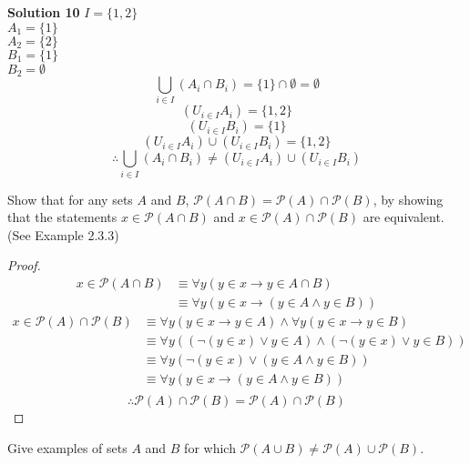 \textbf{Solution 10}
$I = \{1, 2\}$ \\
$A_1 = \{1\}$ \\
$A_2 = \{2\}$ \\
$B_1 = \{1\}$ \\
$B_2 = \emptyset$ \\
\[\bigcup_{i \in I}(A_i \cap B_i) = \{1\} \cap \emptyset = \emptyset\]
\[\left(U_{i \in I}A_i\right) = \{1, 2\}\]
\[\left(U_{i \in I}B_i\right) = \{1\}\]
\[\left(U_{i \in I}A_i\right) \cup \left(U_{i \in I}B_i\right) = \{1, 2\}\]
\[\therefore \bigcup_{i \in I}(A_i \cap B_i) \not = \left(U_{i \in I}A_i\right) \cup \left(U_{i \in I}B_i\right)\]

\begin{tcolorbox}[title=Problem 11, breakable]
    Show that for any sets $A$ and $B$, $\mathcal{P}(A \cap B) = \mathcal{P}(A) \cap \mathcal{P}(B)$,
    by showing that the statements $x \in \mathcal{P}(A \cap B)$ and 
    $x \in \mathcal{P}(A) \cap \mathcal{P}(B)$ are equivalent. (See Example 2.3.3)
\end{tcolorbox}

\begin{proof}
    \begin{align*}
        x \in \mathcal{P}(A \cap B)
            &\equiv \forall{y}(y \in x \rightarrow y \in A \cap B) && \\
            &\equiv \forall{y}(y \in x \rightarrow (y \in A \wedge y \in B)) 
    \end{align*}
    \begin{align*}
        x \in \mathcal{P}(A) \cap \mathcal{P}(B)
            &\equiv \forall{y}(y \in x \rightarrow y \in A) \wedge \forall{y}(y \in x \rightarrow y \in B) && \\
            &\equiv \forall{y}((\neg(y \in x) \vee y \in A) \wedge (\neg(y \in x) \vee y \in B)) && \\
            &\equiv \forall{y}(\neg(y \in x) \vee (y \in A \wedge y \in B)) && \\
            &\equiv \forall{y}(y \in x \rightarrow (y \in A \wedge y \in B)) && \\
    \end{align*}
    \[\therefore \mathcal{P}(A) \cap \mathcal{P}(B) = \mathcal{P}(A) \cap \mathcal{P}(B)\]
\end{proof}

\begin{tcolorbox}[title=Problem 12, breakable]
    Give examples of sets $A$ and $B$ for which 
    $\mathcal{P}(A \cup B) \not = \mathcal{P}(A) \cup \mathcal{P}(B)$.
\end{tcolorbox}

